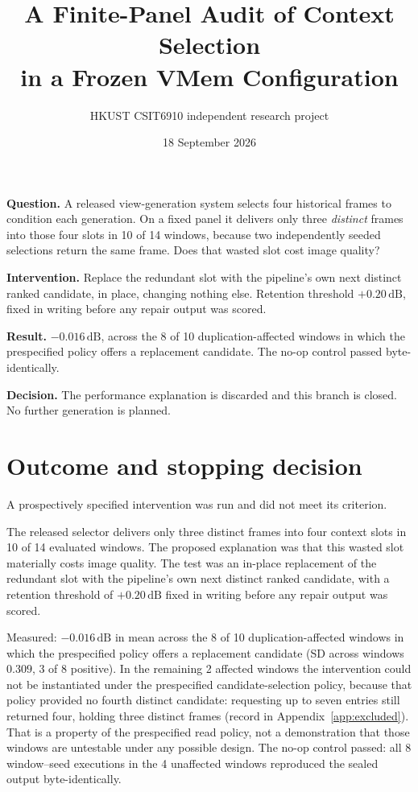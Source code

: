 \documentclass[11pt,a4paper]{article}
\title{\bfseries A Finite-Panel Audit of Context Selection\\in a Frozen VMem Configuration}
\author{HKUST CSIT6910 independent research project}
\date{18 September 2026}
\newcommand{\dB}{\,\mathrm{dB}}
\begin{document}
\maketitle
\thispagestyle{empty}

\begin{center}
\begin{minipage}{0.92\textwidth}
\small
\textbf{Question.} A released view-generation system selects four historical frames to condition
each generation. On a fixed panel it delivers only three \emph{distinct} frames into those four
slots in 10 of 14 windows, because two independently seeded selections return the same frame. Does
that wasted slot cost image quality?


\smallskip
\textbf{Intervention.} Replace the redundant slot with the pipeline's own next distinct ranked
candidate, in place, changing nothing else. Retention threshold $+0.20\dB$, fixed in writing before
any repair output was scored.


\smallskip
\textbf{Result.} $\mathbf{-0.016\dB}$, across the 8 of 10 duplication-affected windows in which the
prespecified policy offers a replacement candidate. The no-op control passed byte-identically.


\smallskip
\textbf{Decision.} The performance explanation is discarded and this branch is closed. No further
generation is planned.
\end{minipage}
\end{center}

\vspace{0.8em}

\section{Outcome and stopping decision}

A prospectively specified intervention was run and did not meet its criterion.

The released selector delivers only three distinct frames into four context slots in 10 of 14
evaluated windows. The proposed explanation was that this wasted slot materially costs image
quality. The test was an in-place replacement of the redundant slot with the pipeline's own next
distinct ranked candidate, with a retention threshold of $+0.20\dB$ fixed in writing before any
repair output was scored.

Measured: $-0.016\dB$ in mean across the 8 of 10 duplication-affected windows in which the
prespecified policy offers a replacement candidate (SD across windows $0.309$, 3 of 8 positive). In
the remaining 2 affected windows the intervention could not be instantiated under the prespecified
candidate-selection policy, because that policy provided no fourth distinct candidate: requesting up
to seven entries still returned four, holding three distinct frames (record in
Appendix~\ref{app:excluded}). That is a property of the prespecified read policy, not a
demonstration that those windows are untestable under any possible design. The no-op control
passed: all 8 window--seed executions in the 4 unaffected windows reproduced the sealed output
byte-identically.
\end{document}
